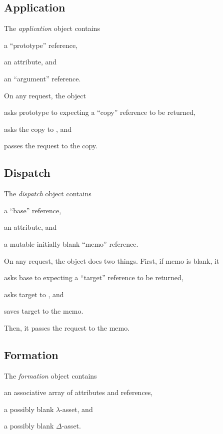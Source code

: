 \subsection{Application}

The \emph{application} object contains
\begin{inparaenum}[1)]
\item a ``prototype'' reference,
\item an attribute,
and
\item an ``argument'' reference.
\end{inparaenum}

On any request, the object
\begin{inparaenum}[1)]
\item asks prototype to  expecting a ``copy'' reference to be returned,
\item asks the copy to ,
and
\item passes the request to the copy.
\end{inparaenum}

\subsection{Dispatch}

The \emph{dispatch} object contains
\begin{inparaenum}[1)]
\item a ``base'' reference,
\item an attribute,
and
\item a mutable initially blank ``memo'' reference.
\end{inparaenum}

On any request, the object does two things.
First, if memo is blank, it
\begin{inparaenum}[1)]
\item asks base to  expecting a ``target'' reference to be returned,
\item asks target to ,
and
\item saves target to the memo.
\end{inparaenum}
Then, it passes the request to the memo.

\subsection{Formation}

The \emph{formation} object contains
\begin{inparaenum}[1)]
\item an associative array of attributes and references,
\item a possibly blank \(\lambda\)-asset,
and
\item a possibly blank \(\Delta\)-asset.
\end{inparaenum}

